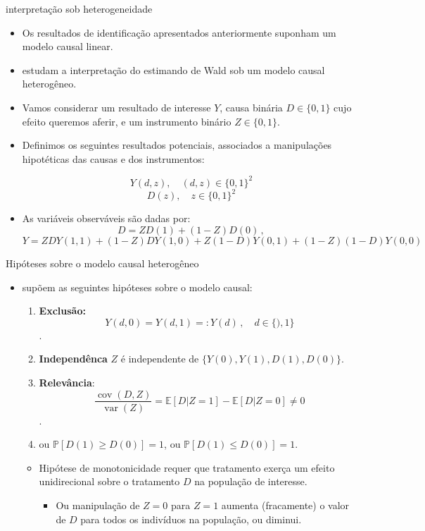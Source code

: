 \documentclass[11pt]{beamer}
\begin{document}
\begin{frame}{interpretação sob heterogeneidade}
	\begin{itemize}
		\item Os resultados de identificação apresentados anteriormente suponham um modelo causal linear.
		\item \citet{Imbens1994} estudam a interpretação do estimando de Wald sob um modelo causal heterogêneo.
		\item Vamos considerar um resultado de interesse $Y$, causa binária $D \in \{0,1\}$ cujo efeito queremos aferir, e um instrumento binário $Z \in \{0,1\}$.
		\item Definimos os seguintes resultados potenciais, associados a manipulações hipotéticas das causas e dos instrumentos:
		
		$$Y(d,z), \quad (d,z) \in \{0,1\}^2$$
		$$D(z), \quad z \in \{0,1\}^2$$
		\item As variáveis observáveis são dadas por:
		{\small 
		$$D = Z D(1)+(1-Z) D(0)\, ,$$
		$$Y = ZD Y(1,1) + (1-Z)DY(1,0) + Z(1-D) Y(0,1) + (1-Z)(1-D) Y(0,0)$$
	}
	\end{itemize}
\end{frame}
\begin{frame}{Hipóteses sobre o modelo causal heterogêneo}
\begin{itemize}
	\item 	\citet{Imbens1994} supõem as seguintes hipóteses sobre o modelo causal:
	\begin{enumerate}
		\item \textbf{Exclusão:} $$Y(d,0)= Y(d,1) =: Y(d)\, ,\quad d \in \{),1\}$$.
		\item \textbf{Independênca} $Z$ é independente de $\{Y(0), Y(1), D(1), D(0)\}$.
		\item \textbf{Relevância}: $$\frac{\operatorname{cov}(D,Z)}{\operatorname{var}(Z)} = \mathbb{E}[D|Z=1] - \mathbb{E}[D|Z=0]\neq 0$$.
		\item  {} ou $\mathbb{P}[D(1)\geq D(0)]=1$, ou $\mathbb{P}[D(1)\leq D(0)]=1$.
	\end{enumerate}
	\begin{itemize}
		\item Hipótese de monotonicidade requer que tratamento exerça um efeito unidirecional sobre o tratamento $D$ na população de interesse.
		\begin{itemize}
			\item Ou manipulação de $Z=0$ para $Z=1$ aumenta (fracamente) o valor de $D$ para todos os indivíduos na população, ou diminui.
		\end{itemize}
	\end{itemize}
\end{itemize}
\end{frame}
\end{document}
